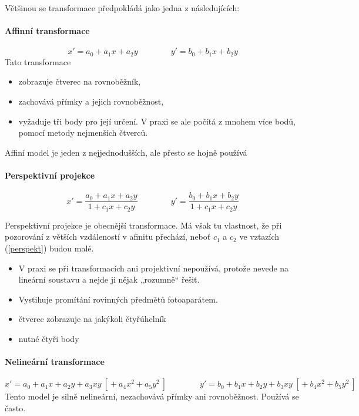 Většinou se transformace předpokládá jako jedna z následujících:
\paragraph{Affinní transformace}
\begin{equation}
x' = a_0+a_1x+a_2y \qquad \qquad
y' = b_0+b_1x+b_2y\label{afinita}
\end{equation}
Tato transformace
\begin{itemize}
\item zobrazuje čtverec na rovnoběžník,
\item zachovává přímky a jejich rovnoběžnost,
\item vyžaduje tři body pro její určení. V praxi se ale počítá z mnohem více bodů, pomocí metody nejmenších čtverců.
\end{itemize}
Affiní model je jeden z nejjednodušších, ale přesto se hojně používá
 
\paragraph{Perspektivní projekce}
\begin{equation}
x' = \frac{a_0+a_1x+a_2y}{1+c_1x+c_2y} \qquad \qquad
y' = \frac{b_0+b_1x+b_2y}{1+c_1x+c_2y}\label{perspekt}
\end{equation}

Perspektivní projekce je obecnější transformace. Má však tu vlastnost, že při pozorování z větších vzdáleností v afinitu
přechází, neboť $c_1$ a $c_2$ ve vztazích (\ref{perspekt}) budou malé.

\begin{itemize}
	\item V praxi se při transformacích ani projektivní nepoužívá, protože nevede na lineární soustavu a nejde ji nějak „rozumně“ řešit.
	\item Vystihuje promítání rovinných předmětů fotoaparátem.
	\item čtverec zobrazuje na jakýkoli čtyřúhelník
	\item nutné čtyři body
\end{itemize}


\paragraph{Nelineární transformace}
\begin{equation}
x' = a_0+a_1x+a_2y+a_3xy\ [{}+a_4x^2+a_5y^2\ ] \qquad \qquad
y' = b_0+b_1x+b_2y+b_3xy\ [{}+b_4x^2+b_5y^2\ ]
\end{equation}
Tento model je silně nelineární, nezachovává přímky ani rovnoběžnost. Používá se často.

